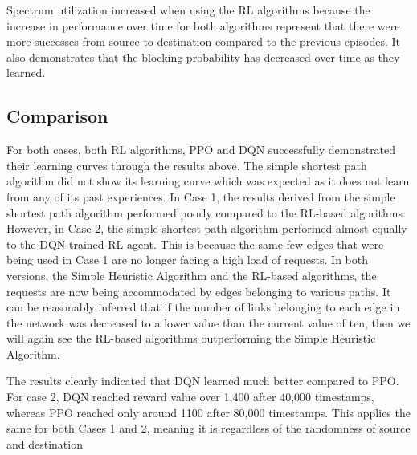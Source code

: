 \documentclass[conference]{IEEEtran}
\begin{document}
 Spectrum utilization increased when using the RL algorithms because the increase in performance over time for both algorithms represent that there were more successes from source to destination compared to the previous episodes. It also demonstrates that the blocking probability has decreased over time as they learned.
\subsection{Comparison}
For both cases, both RL algorithms, PPO and DQN successfully demonstrated their learning curves through the results above. The simple shortest path algorithm did not show its learning curve which was expected as it does not learn from any of its past experiences. In Case 1, the results derived from the simple shortest path algorithm performed poorly compared to the RL-based algorithms. However, in Case 2, the simple shortest path algorithm performed almost equally to the DQN-trained RL agent. This is because the same few edges that were being used in Case 1 are no longer facing a high load of requests. In both versions, the Simple Heuristic Algorithm and the RL-based algorithms, the requests are now being accommodated by edges belonging to various paths. It can be reasonably inferred that if the number of links belonging to each edge in the network was decreased to a lower value than the current value of ten, then we will again see the RL-based algorithms outperforming the Simple Heuristic Algorithm.

The results clearly indicated that DQN learned much better compared to PPO. For case 2, DQN reached reward value over 1,400 after 40,000 timestamps, whereas PPO reached only around 1100 after 80,000 timestamps. This applies the same for both Cases 1 and 2, meaning it is regardless of the randomness of source and destination



\end{document}
